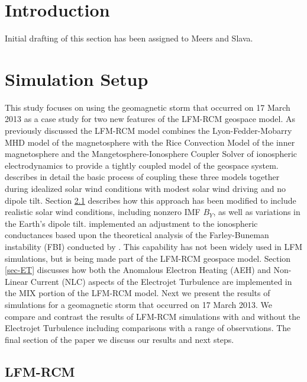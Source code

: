 \documentclass[draft,jgrga]{agutex}
\begin{document}
\begin{article}

%
%

\section{Introduction}

Initial drafting of this section has been assigned to Meers and Slava.

\section{Simulation Setup}
\label{sec-model-sims}
This study focuses on using the geomagnetic storm that occurred on 17 March 2013 as a case study for two new features of the LFM-RCM geospace model.   As previously discussed the LFM-RCM model combines the Lyon-Fedder-Mobarry MHD model of the magnetosphere with the Rice Convection Model of the inner magnetosphere and the Mangetosphere-Ionosphere Coupler Solver of ionospheric electrodynamics to provide a tightly coupled model of the geospace system. \cite{Pembroke:2012gc} describes in detail the basic process of coupling these three models together during idealized solar wind conditions with modest solar wind driving and no dipole tilt.  Section \ref{sec-lfm-rcm} describes how this approach has been modified to include realistic solar wind conditions, including nonzero IMF $B_Y$, as well as variations in the Earth's dipole tilt.  \cite{2005GeoRL..3222101M} implemented an adjustment to the ionospheric conductances based upon the theoretical analysis of the Farley-Buneman instability (FBI) conducted by \cite{2003JGRA..108.1350D}.  This capability has not been widely used in LFM simulations, but is being made part of the LFM-RCM geospace model.  Section \ref{sec-ET} discusses how both the Anomalous Electron Heating (AEH) and Non-Linear Current (NLC) aspects of the Electrojet Turbulence are implemented in the MIX portion of the LFM-RCM model.  Next we present the results of simulations for a geomagnetic storm that occurred on 17 March 2013.  We compare and contrast the results of LFM-RCM simulations with and without the Electrojet Turbulence including comparisons with a range of observations.  The final section of the paper we discuss our results and next steps.

\subsection{LFM-RCM}
\label{sec-lfm-rcm}


\end{article}
\end{document}
